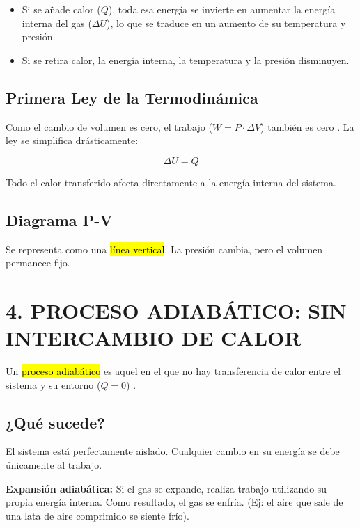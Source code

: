 \documentclass{article}
\begin{document}
\begin{itemize}
    \item Si se añade calor ($Q$), toda esa energía se invierte en aumentar la energía interna del gas ($\Delta U$), lo que se traduce en un aumento de su temperatura y presión.
    \item Si se retira calor, la energía interna, la temperatura y la presión disminuyen.
\end{itemize}

\subsection*{Primera Ley de la Termodinámica}

Como el cambio de volumen es cero, el trabajo ($W = P \cdot \Delta V$) también es cero \parencite{manrique2001}. La ley se simplifica drásticamente:

$$\Delta U = Q$$

Todo el calor transferido afecta directamente a la energía interna del sistema.

\subsection*{Diagrama P-V}

Se representa como una \hl{línea vertical}. La presión cambia, pero el volumen permanece fijo.

\vspace{5mm}

\section*{4. PROCESO ADIABÁTICO: SIN INTERCAMBIO DE CALOR}

Un \hl{proceso adiabático} es aquel en el que no hay transferencia de calor entre el sistema y su entorno ($Q = 0$) \parencite{wiki:proceso_adiabatico}.

\subsection*{¿Qué sucede?}

El sistema está perfectamente aislado. Cualquier cambio en su energía se debe únicamente al trabajo.

\textbf{Expansión adiabática:} Si el gas se expande, realiza trabajo utilizando su propia energía interna. Como resultado, el gas se enfría. (Ej: el aire que sale de una lata de aire comprimido se siente frío).
\end{document}

